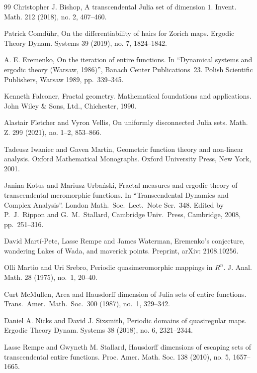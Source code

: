 \documentclass[12pt,a4paper]{amsart}
\theoremstyle{plain}
\theoremstyle{definition}
\theoremstyle{remark}
\numberwithin{equation}{section}
\begin{document}
\begin{thebibliography}{99}
Christopher J. Bishop,
A transcendental Julia set of dimension $1$.
Invent. Math. 212 (2018), no. 2, 407--460.

Patrick Comd\"uhr,
On the differentiability of hairs for Zorich maps. 
Ergodic Theory Dynam. Systems 39 (2019), no. 7, 1824--1842. 

A. E. Eremenko,
On the iteration of entire functions.
In ``Dynamical systems and ergodic theory (Warsaw, 1986)'', Banach Center Publications~23.
Polish Scientific Publishers, Warsaw 1989, pp.~339--345.


Kenneth Falconer, 
Fractal geometry. Mathematical foundations and applications. 
John Wiley \& Sons, Ltd., Chichester, 1990.

Alastair Fletcher and Vyron Vellis, On uniformly disconnected Julia sets. 
Math. Z. 299 (2021), no. 1--2, 853–866.

Tadeusz Iwaniec and Gaven Martin,
Geometric function theory and non-linear analysis.
Oxford Mathematical Monographs.
Oxford University Press, New York, 2001.

Janina Kotus and Mariusz Urba\'nski,
Fractal measures and ergodic theory of transcendental meromorphic functions.
In ``Transcendental Dynamics and Complex Analysis''.
London Math.\ Soc.\ Lect.\ Note Ser.\ 348.
Edited by P.\ J.\ Rippon
and G.\ M.\ Stallard,
Cambridge Univ.\ Press, Cambridge, 2008, pp.~251--316.

David Martí-Pete, Lasse Rempe and James Waterman,
Eremenko's conjecture, wandering Lakes of Wada, and maverick points.
Preprint, arXiv: 2108.10256.

Olli Martio and Uri Srebro,
Periodic quasimeromorphic mappings in $R^n$.
 J. Anal. Math. 28 (1975), no.~1, 20--40.

Curt McMullen, Area and Hausdorff dimension of Julia sets of entire functions.
Trans.\ Amer.\ Math.\ Soc.\ 300 (1987), no.~1, 329--342.

Daniel A. Nicks and David J. Sixsmith,
Periodic domains of quasiregular maps. 
Ergodic Theory Dynam. Systems 38 (2018), no. 6, 2321--2344. 

Lasse Rempe and Gwyneth M. Stallard,
Hausdorff dimensions of escaping sets of transcendental entire functions. 
Proc. Amer. Math. Soc. 138 (2010), no. 5, 1657--1665. 


\end{thebibliography}
\end{document}
